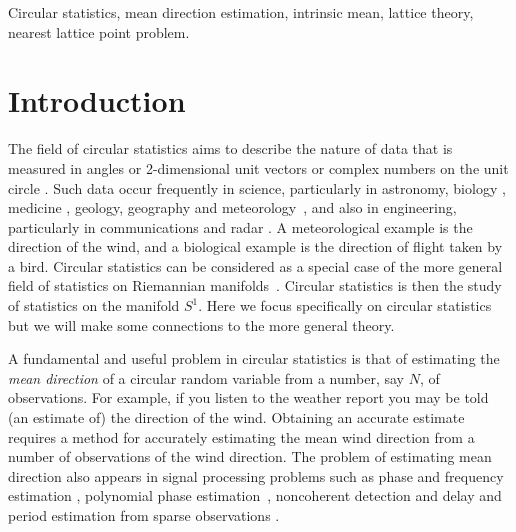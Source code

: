 \documentclass[journal]{IEEEtran}
\begin{document}
\begin{IEEEkeywords}
Circular statistics, mean direction estimation, intrinsic mean, lattice theory, nearest lattice point problem.
\end{IEEEkeywords}


\section{Introduction}\label{sec:introduction}

The field of circular statistics aims to describe the nature of data that is measured in angles or 2-dimensional unit vectors or complex numbers on the unit circle \cite{Mardia_directional_statistics,Jupp_mardia_unified_directional_statistics_1989,mardia_stat_dir_data_book_1975,Fisher1993,Jammalamadaka_dir_stat_book}.  Such data occur frequently in science, particularly in astronomy, biology \cite{batschelet1981circular,Cochranmigbridcalcircstat2004,Bolesspinylobnavcircstat2003}, medicine \cite{Mann_circstat_med_cement_2003,Lediseasecircstat2003}, geology, geography and meteorology~\cite{Fisher_bootstrap_geo_1_1990,Marida_geosciences_1981}, and also in engineering, particularly in communications and radar \cite{Fogel1989_bit_synch_zero_crossings,Elton96robustparameter1996,Clarkson2007,McKilliamLinearTimeBlockPSK2009,McKilliam2007}.  A meteorological example is the direction of the wind, and a biological example is the direction of flight taken by a bird. %
Circular statistics can be considered as a special case of the more general field of statistics on Riemannian manifolds~\cite{Bhattacharya_int_ext_means_2003,Bhattacharya_int_ext_means_2005,Pennec_int_st_rm_2006,bwhk07a}.  Circular statistics is then the study of statistics on the manifold $S^1$.  Here we focus specifically on circular statistics but we will make some connections to the more general theory.

A fundamental and useful problem in circular statistics is that of estimating the \emph{mean direction} of a circular random variable from a number, say $N$, of observations. For example, if you listen to the weather report you may be told (an estimate of) the direction of the wind.  Obtaining an accurate estimate requires a method for accurately estimating the mean wind direction from a number of observations of the wind direction. The problem of estimating mean direction also appears in signal processing problems such as phase and frequency estimation \cite{Quinn2009_dasp_phase_only_information_loss,Lovell1991,McKilliamFrequencyEstimationByPhaseUnwrapping2009,Quinn2001,McKilliam2010thesis}, polynomial phase estimation~\cite{McKilliam2009asilomar_polyest_lattice,McKilliam2010thesis,Kitchen_polyphase_unwrapping_1994}, noncoherent detection \cite{McKilliamLinearTimeBlockPSK2009,McKilliam2010thesis,Mackenthun1994} and delay and period estimation from sparse observations \cite{Elton96robustparameter1996,Clarkson2007,McKilliam2007,McKilliam2010thesis,Fogel1989_bit_synch_zero_crossings}. 
\end{document}
